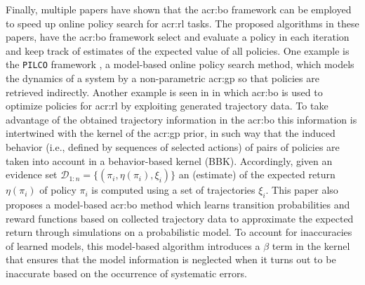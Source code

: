 Finally, multiple papers have shown that the \acrshort{acr:bo} framework can be employed to speed up online policy search for \acrshort{acr:rl} tasks.
The proposed algorithms in these papers, have the \acrshort{acr:bo} framework select and evaluate a policy in each iteration and keep track of estimates of the expected value of all policies.
One example is the \texttt{PILCO} framework \cite{deisenroth2011pilco}, a model-based online policy search method, which models the dynamics of a system by a non-parametric \acrshort{acr:gp} so that policies are retrieved indirectly.
Another example is seen in \cite{wilson2014using} in which \acrlong{acr:bo} is used to optimize policies for \acrshort{acr:rl} by exploiting generated trajectory data.
To take advantage of the obtained trajectory information in the \acrlong{acr:bo} this information is intertwined with the kernel of the \acrshort{acr:gp} prior, in such way that the induced behavior (i.e., defined by sequences of selected actions) of pairs of policies are taken into account in a behavior-based kernel (BBK).
Accordingly, given an evidence set $\mathcal{D}_{1:n} = \{(\pi_i, \eta(\pi_i), \xi_i)\}$ an (estimate) of the expected return $\eta(\pi_i)$ of policy $\pi_i$ is computed using a set of trajectories $\xi_i$.
This paper also proposes a model-based \acrlong{acr:bo} method which learns transition probabilities and reward functions based on collected trajectory data to approximate the expected return through simulations on a probabilistic model.
To account for inaccuracies of learned models, this model-based algorithm introduces a $\beta$ term in the kernel that ensures that the model information is neglected when it turns out to be inaccurate based on the occurrence of systematic errors.


